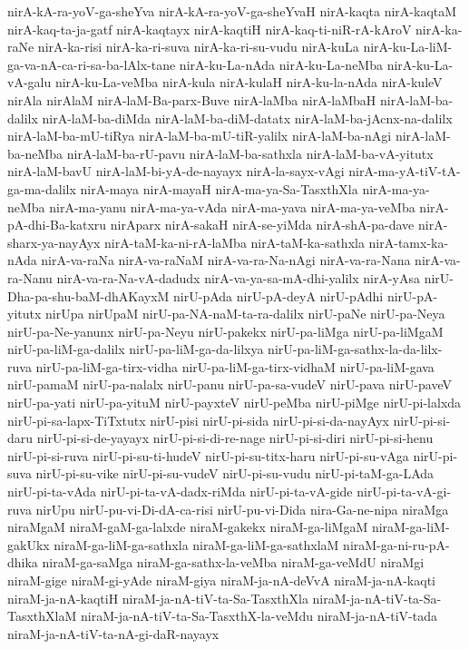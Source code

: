 {nirA-kA-ra-yoV-ga-sheYva
nirA-kA-ra-yoV-ga-sheYvaH
nirA-kaqta
nirA-kaqtaM
nirA-kaq-ta-ja-gatf
nirA-kaqtayx
nirA-kaqtiH
nirA-kaq-ti-niR-rA-kAroV
nirA-ka-raNe
nirA-ka-risi
nirA-ka-ri-suva
nirA-ka-ri-su-vudu
nirA-kuLa
nirA-ku-La-liM-ga-va-nA-ca-ri-sa-ba-lAlx-tane
nirA-ku-La-nAda
nirA-ku-La-neMba
nirA-ku-La-vA-galu
nirA-ku-La-veMba
nirA-kula
nirA-kulaH
nirA-ku-la-nAda
nirA-kuleV
nirAla
nirAlaM
nirA-laM-Ba-parx-Buve
nirA-laMba
nirA-laMbaH
nirA-laM-ba-dalilx
nirA-laM-ba-diMda
nirA-laM-ba-diM-datatx
nirA-laM-ba-jAcnx-na-dalilx
nirA-laM-ba-mU-tiRya
nirA-laM-ba-mU-tiR-yalilx
nirA-laM-ba-nAgi
nirA-laM-ba-neMba
nirA-laM-ba-rU-pavu
nirA-laM-ba-sathxla
nirA-laM-ba-vA-yitutx
nirA-laM-bavU
nirA-laM-bi-yA-de-nayayx
nirA-la-sayx-vAgi
nirA-ma-yA-tiV-tA-ga-ma-dalilx
nirA-maya
nirA-mayaH
nirA-ma-ya-Sa-TasxthXla
nirA-ma-ya-neMba
nirA-ma-yanu
nirA-ma-ya-vAda
nirA-ma-yava
nirA-ma-ya-veMba
nirA-pA-dhi-Ba-katxru
nirAparx
nirA-sakaH
nirA-se-yiMda
nirA-shA-pa-dave
nirA-sharx-ya-nayAyx
nirA-taM-ka-ni-rA-laMba
nirA-taM-ka-sathxla
nirA-tamx-ka-nAda
nirA-va-raNa
nirA-va-raNaM
nirA-va-ra-Na-nAgi
nirA-va-ra-Nana
nirA-va-ra-Nanu
nirA-va-ra-Na-vA-dadudx
nirA-va-ya-sa-mA-dhi-yalilx
nirA-yAsa
nirU-Dha-pa-shu-baM-dhAKayxM
nirU-pAda
nirU-pA-deyA
nirU-pAdhi
nirU-pA-yitutx
nirUpa
nirUpaM
nirU-pa-NA-naM-ta-ra-dalilx
nirU-paNe
nirU-pa-Neya
nirU-pa-Ne-yanunx
nirU-pa-Neyu
nirU-pakekx
nirU-pa-liMga
nirU-pa-liMgaM
nirU-pa-liM-ga-dalilx
nirU-pa-liM-ga-da-lilxya
nirU-pa-liM-ga-sathx-la-da-lilx-ruva
nirU-pa-liM-ga-tirx-vidha
nirU-pa-liM-ga-tirx-vidhaM
nirU-pa-liM-gava
nirU-pamaM
nirU-pa-nalalx
nirU-panu
nirU-pa-sa-vudeV
nirU-pava
nirU-paveV
nirU-pa-yati
nirU-pa-yituM
nirU-payxteV
nirU-peMba
nirU-piMge
nirU-pi-lalxda
nirU-pi-sa-lapx-TiTxtutx
nirU-pisi
nirU-pi-sida
nirU-pi-si-da-nayAyx
nirU-pi-si-daru
nirU-pi-si-de-yayayx
nirU-pi-si-di-re-nage
nirU-pi-si-diri
nirU-pi-si-henu
nirU-pi-si-ruva
nirU-pi-su-ti-hudeV
nirU-pi-su-titx-haru
nirU-pi-su-vAga
nirU-pi-suva
nirU-pi-su-vike
nirU-pi-su-vudeV
nirU-pi-su-vudu
nirU-pi-taM-ga-LAda
nirU-pi-ta-vAda
nirU-pi-ta-vA-dadx-riMda
nirU-pi-ta-vA-gide
nirU-pi-ta-vA-gi-ruva
nirUpu
nirU-pu-vi-Di-dA-ca-risi
nirU-pu-vi-Dida
nira-Ga-ne-nipa
niraMga
niraMgaM
niraM-gaM-ga-lalxde
niraM-gakekx
niraM-ga-liMgaM
niraM-ga-liM-gakUkx
niraM-ga-liM-ga-sathxla
niraM-ga-liM-ga-sathxlaM
niraM-ga-ni-ru-pA-dhika
niraM-ga-saMga
niraM-ga-sathx-la-veMba
niraM-ga-veMdU
niraMgi
niraM-gige
niraM-gi-yAde
niraM-giya
niraM-ja-nA-deVvA
niraM-ja-nA-kaqti
niraM-ja-nA-kaqtiH
niraM-ja-nA-tiV-ta-Sa-TasxthXla
niraM-ja-nA-tiV-ta-Sa-TasxthXlaM
niraM-ja-nA-tiV-ta-Sa-TasxthX-la-veMdu
niraM-ja-nA-tiV-tada
niraM-ja-nA-tiV-ta-nA-gi-daR-nayayx
}
